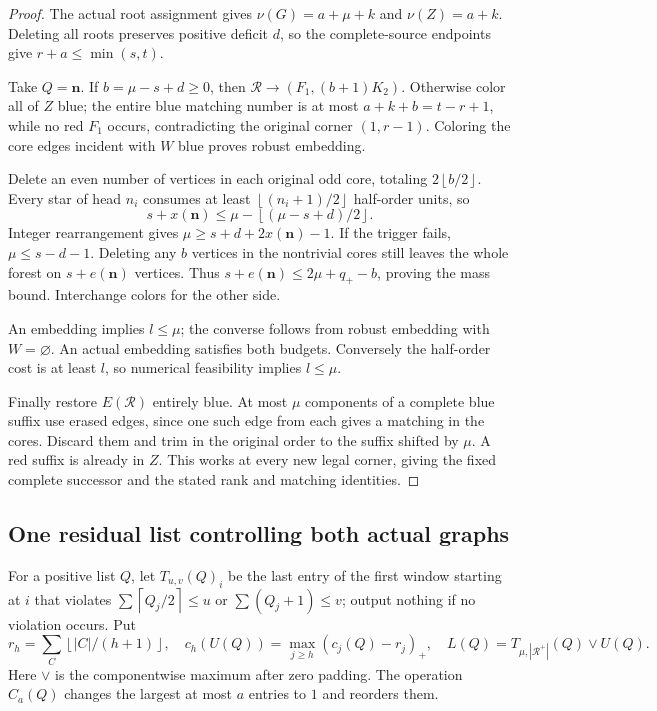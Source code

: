 \documentclass[11pt,a4paper]{article}
\newcommand{\nn}{\mathbf n}\newcommand{\mm}{\mathbf m}
\newcommand{\floor}[1]{\left\lfloor#1\right\rfloor}
\newcommand{\ceil}[1]{\left\lceil#1\right\rceil}
\theoremstyle{definition}
\begin{document}
\begin{proof}
The actual root assignment gives $\nu(G)=a+\mu+k$ and $\nu(Z)=a+k$. Deleting all roots preserves positive deficit $d$, so the complete-source endpoints give $r+a\le\min(s,t)$.

Take $Q=\nn$. If $b=\mu-s+d\ge0$, then $\mathcal R\to(F_1,(b+1)K_2)$. Otherwise color all of $Z$ blue; the entire blue matching number is at most $a+k+b=t-r+1$, while no red $F_1$ occurs, contradicting the original corner $(1,r-1)$. Coloring the core edges incident with $W$ blue proves robust embedding.

Delete an even number of vertices in each original odd core, totaling $2\floor{b/2}$. Every star of head $n_i$ consumes at least $\floor{(n_i+1)/2}$ half-order units, so
\[
s+x(\nn)\le\mu-\floor{(\mu-s+d)/2}.
\]
Integer rearrangement gives $\mu\ge s+d+2x(\nn)-1$. If the trigger fails, $\mu\le s-d-1$. Deleting any $b$ vertices in the nontrivial cores still leaves the whole forest on $s+e(\nn)$ vertices. Thus $s+e(\nn)\le2\mu+q_+-b$, proving the mass bound. Interchange colors for the other side.

An embedding implies $l\le\mu$; the converse follows from robust embedding with $W=\varnothing$. An actual embedding satisfies both budgets. Conversely the half-order cost is at least $l$, so numerical feasibility implies $l\le\mu$.

Finally restore $E(\mathcal R)$ entirely blue. At most $\mu$ components of a complete blue suffix use erased edges, since one such edge from each gives a matching in the cores. Discard them and trim in the original order to the suffix shifted by $\mu$. A red suffix is already in $Z$. This works at every new legal corner, giving the fixed complete successor and the stated rank and matching identities.
\end{proof}

\subsection{One residual list controlling both actual graphs}
For a positive list $Q$, let $T_{u,v}(Q)_i$ be the last entry of the first window starting at $i$ that violates $\sum\ceil{Q_j/2}\le u$ or $\sum(Q_j+1)\le v$; output nothing if no violation occurs. Put
\[
r_h=\sum_C\floor{|C|/(h+1)},\quad
c_h(U(Q))=\max_{j\ge h}(c_j(Q)-r_j)_+,
\quad L(Q)=T_{\mu,|\mathcal R^+|}(Q)\vee U(Q).
\]
Here $\vee$ is the componentwise maximum after zero padding. The operation $C_a(Q)$ changes the largest at most $a$ entries to $1$ and reorders them.
\end{document}
